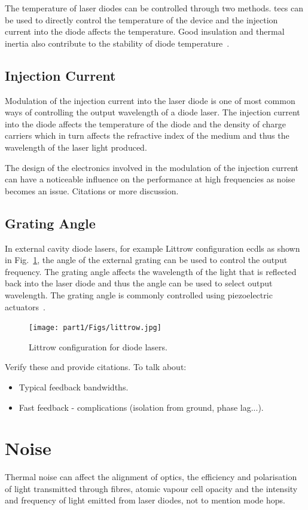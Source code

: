The temperature of laser diodes can be controlled through two methods. \Glspl{tec} can be used to directly control the temperature of the device and the injection current into the diode affects the temperature. Good insulation and thermal inertia also contribute to the stability of diode temperature~\cite{saliba_cold_2011}.

\subsection{Injection Current}
Modulation of the injection current into the laser diode is one of most common ways of controlling the output wavelength of a diode laser.
The injection current into the diode affects the temperature of the diode and the density of charge carriers which in turn affects the refractive index of the medium and thus the wavelength of the laser light produced.

The design of the electronics involved in the modulation of the injection current can have a noticeable influence on the performance at high frequencies as noise becomes an issue.
{\color{red} Citations or more discussion.}

\subsection{Grating Angle}
In external cavity diode lasers, for example Littrow configuration \glspl{ecdl} as shown in Fig.~\ref{figure:littrow}, the angle of the external grating can be used to control the output frequency.
The grating angle affects the wavelength of the light that is reflected back into the laser diode and thus the angle can be used to select output wavelength.
The grating angle is commonly controlled using piezoelectric actuators~\cite{hawthorn_littrow_2001}.

\begin{figure}
\texttt{[image: part1/Figs/littrow.jpg]}
\caption{Littrow configuration for diode lasers.}
\label{figure:littrow}
\end{figure}

{\color{red} Verify these and provide citations.}
To talk about:
\begin{itemize}
\item Typical feedback bandwidths.
\item Fast feedback - complications (isolation from ground, phase lag...).
\end{itemize}


\section{Noise}
Thermal noise can affect the alignment of optics, the efficiency and polarisation of light transmitted through fibres, atomic vapour cell opacity and the intensity and frequency of light emitted from laser diodes, not to mention mode hops.

